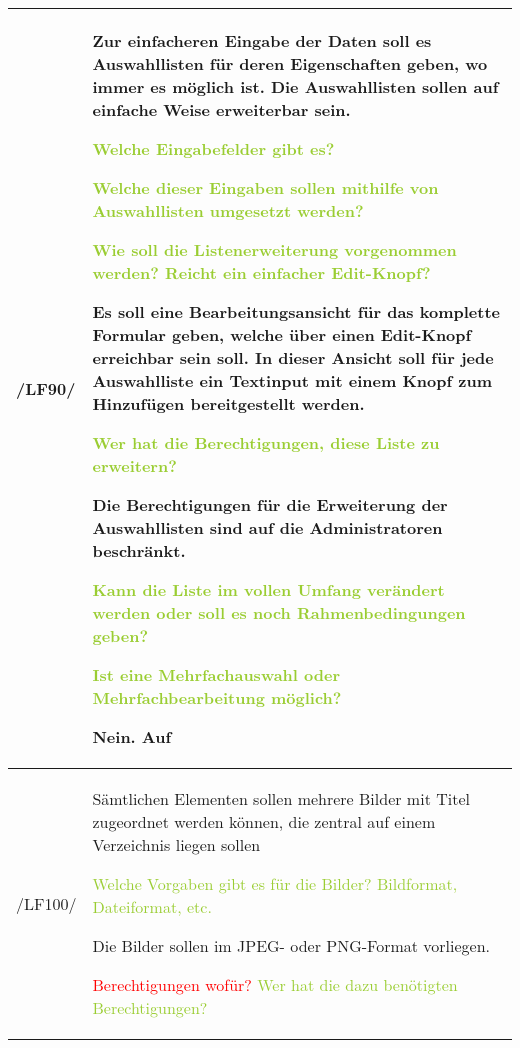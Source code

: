 \begin{tabular}[ht] {l | p{13cm}}
    \hline
    /LF90/ & Zur einfacheren Eingabe der Daten soll es Auswahllisten für deren Eigenschaften geben, wo immer es möglich ist. Die Auswahllisten sollen auf einfache Weise erweiterbar sein. 
    
    \textcolor{YellowGreen}{Welche Eingabefelder gibt es?}

    \textcolor{NavyBlue}{}
    \textcolor{YellowGreen}{Welche dieser Eingaben sollen mithilfe von Auswahllisten umgesetzt werden?}

    \textcolor{NavyBlue}{}
    \textcolor{YellowGreen}{Wie soll die Listenerweiterung vorgenommen werden? Reicht ein einfacher \grqq{}Edit\grqq{}-Knopf?}

    \textcolor{NavyBlue}{Es soll eine Bearbeitungsansicht für das komplette Formular geben, welche über einen \grqq{}Edit\grqq{}-Knopf erreichbar sein soll. In dieser Ansicht soll für jede Auswahlliste ein Textinput mit einem Knopf zum Hinzufügen bereitgestellt werden.}

    \textcolor{YellowGreen}{Wer hat die Berechtigungen, diese Liste zu erweitern?}

    \textcolor{NavyBlue}{Die Berechtigungen für die Erweiterung der Auswahllisten sind auf die Administratoren beschränkt.}

    \textcolor{YellowGreen}{Kann die Liste im vollen Umfang verändert werden oder soll es noch Rahmenbedingungen geben?}

    \textcolor{NavyBlue}{}

    \textcolor{YellowGreen}{Ist eine Mehrfachauswahl oder Mehrfachbearbeitung möglich?}

    \textcolor{NavyBlue}{Nein. Auf }
    \\
    \hline
    /LF100/ & Sämtlichen Elementen sollen mehrere Bilder mit Titel zugeordnet werden können, die zentral auf einem Verzeichnis liegen sollen 
    
    \textcolor{YellowGreen}{Welche Vorgaben gibt es für die Bilder? Bildformat, Dateiformat, etc.}

    \textcolor{NavyBlue}{Die Bilder sollen im JPEG- oder PNG-Format vorliegen.}

    \textcolor{Red}{Berechtigungen wofür?}
    \textcolor{YellowGreen}{Wer hat die dazu benötigten Berechtigungen?}

    \textcolor{NavyBlue}{}


\end{tabular}

